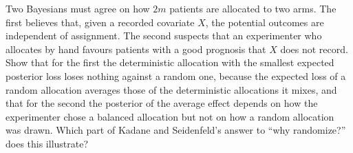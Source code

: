\begin{exercises}
\item\label{ex:chframeworks:8} Two Bayesians must agree on how $2m$ patients are allocated to two arms. The first believes that, given a recorded covariate $X$, the potential outcomes are independent of assignment. The second suspects that an experimenter who allocates by hand favours patients with a good prognosis that $X$ does not record. Show that for the first the deterministic allocation with the smallest expected posterior loss loses nothing against a random one, because the expected loss of a random allocation averages those of the deterministic allocations it mixes, and that for the second the posterior of the average effect depends on how the experimenter chose a balanced allocation but not on how a random allocation was drawn. Which part of Kadane and Seidenfeld's answer to ``why randomize?'' does this illustrate?
\end{exercises}
